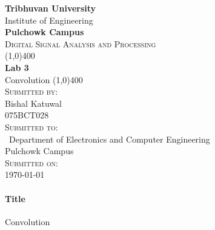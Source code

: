 \documentclass[12pt]{article}
\begin{document}
    

\begin{titlepage}
    \begin{center}
        \huge{\bfseries  Tribhuvan University}\\
        \Large{Institute of Engineering}\\
        \huge{ \bfseries  Pulchowk Campus}\\[3.2cm]


        \textsc{\Large Digital Signal Analysis and Processing}\\[-0.5cm]
        \line(1,0){400}\\
        \huge{\bfseries Lab 3}\\
        \huge{Convolution}
        \line(1,0){400}\\


        \textsc{\Large Submitted by:}\\
        \Large Bishal Katuwal\\ \large 075BCT028\\    [0.85cm]

        \textsc{\Large Submitted to:}\\\
        \large Department of Electronics and Computer Engineering\\Pulchowk Campus\\    [0.85cm]
        
        \textsc{\Large Submitted on:}\\
        \today
        
    \end{center}
\end{titlepage}
\pagebreak
\paragraph{Title\\}
Convolution
\end{document}
